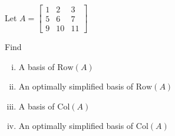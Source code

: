 \begin{example}
	Let $A = \begin{bmatrix}
		1&2&3\\5&6&7\\9&10&11
	\end{bmatrix}$

	Find \begin{enumerate}[i)]
		\item A basis of $\mathrm{Row}(A)$
		\item An optimally simplified basis of $\mathrm{Row}(A)$
		\item A basis of $\mathrm{Col}(A)$
		\item An optimally simplified basis of $\mathrm{Col}(A)$
	\end{enumerate}
\end{example}

